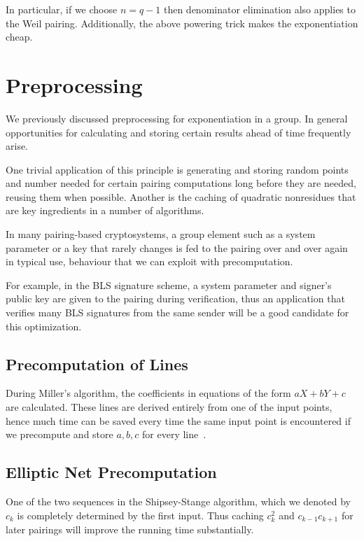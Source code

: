 In particular, if we choose $n = q - 1$ then denominator elimination
also applies to the Weil pairing. Additionally, the above powering trick
makes the exponentiation cheap.

\section {Preprocessing}

We previously discussed preprocessing for exponentiation in a group.
In general opportunities for calculating and storing
certain results ahead of time frequently arise.

One trivial application of this principle
is generating and storing random points and number needed for certain pairing
computations long before they are needed, reusing them when possible.
Another is the caching of quadratic nonresidues that are key
ingredients in a number of algorithms.

In many pairing-based cryptosystems, a group element such as a system parameter
or a key that rarely changes is fed to the pairing over and over again in
typical use, behaviour that we can exploit with precomputation.

For example, in the BLS signature scheme, a system parameter and
signer's public key are given to the pairing during verification, thus
an application that verifies many BLS signatures from the same sender will be a
good candidate for this optimization.

\subsection {Precomputation of Lines}

During Miller's algorithm, the coefficients in equations of the form
$aX + bY + c$ are calculated. These lines
are derived entirely from one of the input points,
hence much time can be saved every time the same input point is encountered
if we precompute and store $a, b, c$ for every line~\cite{bakls}.

\subsection {Elliptic Net Precomputation}

One of the two sequences in the Shipsey-Stange algorithm, which
we denoted by $c_k$ is completely determined by the first input.
Thus caching $c_k^2$ and $c_{k-1}c_{k+1}$ for later pairings
will improve the running time substantially.

